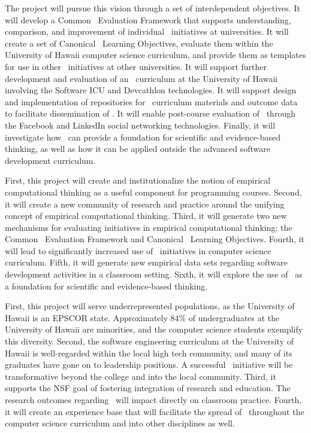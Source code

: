 The project will pursue this vision through a set of interdependent
objectives. It will develop a Common \eCT\ Evaluation Framework that
supports understanding, comparison, and improvement of individual \eCT\
initiatives at universities. It will create a set of Canonical \eCT\
Learning Objectives, evaluate them within the University of Hawaii computer
science curriculum, and provide them as templates for use in other \eCT\
initiatives at other universities.  It will support further development and
evaluation of an \eCT\ curriculum at the University of Hawaii involving the
Software ICU and Devcathlon technologies.  It will support design and
implementation of repositories for \eCT\ curriculum materials and outcome
data to facilitate dissemination of \eCT.  It will enable
post-course evaluation of \eCT\ through the Facebook and LinkedIn social
networking technologies. Finally, it will investigate how \eCT\ can provide
a foundation for scientific and evidence-based thinking, as well as how it
can be applied outside the advanced software development curriculum.

\medskip

  First, this project will create and
institutionalize the notion of empirical computational thinking as a useful
component for programming courses. Second, it will create a new
community of research and practice around the unifying concept of empirical
computational thinking.  Third, it will generate two new
mechanisms for evaluating initiatives in empirical computational thinking:
the Common \eCT\ Evaluation Framework and Canonical \eCT\ Learning
Objectives. Fourth, it will lead to significantly increased use
of \eCT\ initiatives in computer science curriculum. Fifth, it 
will generate new empirical data sets regarding software development
activities in a classroom setting. Sixth, it will explore the use of \eCT\
as a foundation for scientific and evidence-based thinking.

\medskip 

\noindent{\bf Broader Impacts.}  First, this project will serve
underrepresented populations, as the University of Hawaii is an EPSCOR
state. Approximately 84\% of undergraduates at the University of Hawaii are
minorities, and the computer science students exemplify this diversity.
Second, the software engineering curriculum at the University of Hawaii is
well-regarded within the local high tech community, and many of its
graduates have gone on to leadership positions. A successful \eCT\
initiative will be transformative beyond the college and into the local
community.  Third, it supports the NSF goal of fostering
integration of research and education.  The research outcomes regarding
\eCT\ will impact directly on classroom practice. Fourth, it will create an
experience base that will facilitate the spread of \eCT\ throughout the
computer science curriculum and into other disciplines as well.


